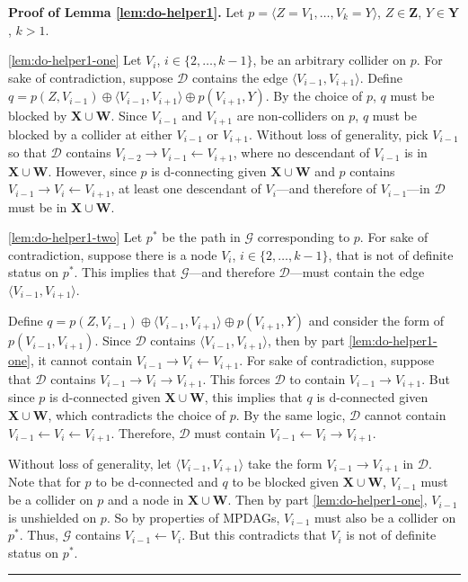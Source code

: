 \documentclass[11pt]{article}
\newcommand{\BlackBox}{\rule{1.5ex}{1.5ex}}  %
\newcommand{\mb}[1]{\mathbf{#1}}
\newcommand{\g}[1][G]{\mathcal{#1}}
\newenvironment{proofof}[1][]{\noindent \textbf{Proof of #1.}}{\hfill\BlackBox}
\begin{document}
\begin{proofof}[Lemma \ref{lem:do-helper1}]
    Let $p = \langle Z=V_1, \dots, V_k=Y \rangle$, $Z \in \mb{Z}$, $Y \in \mb{Y}$, $k > 1$.
    
    \ref{lem:do-helper1-one}
    Let $V_i$, $i \in \{2, \dots, k-1\}$, be an arbitrary collider on $p$. For sake of contradiction, suppose $\g[D]$ contains the edge $\langle V_{i-1}, V_{i+1} \rangle$. Define $q = p(Z,V_{i-1}) \oplus \langle V_{i-1}, V_{i+1} \rangle \oplus p(V_{i+1}, Y)$. By the choice of $p$, $q$ must be blocked by $\mb{X} \cup \mb{W}$. Since $V_{i-1}$ and $V_{i+1}$ are non-colliders on $p$, $q$ must be blocked by a collider at either $V_{i-1}$ or $V_{i+1}$. Without loss of generality, pick $V_{i-1}$ so that $\g[D]$ contains $V_{i-2} \to V_{i-1} \gets V_{i+1}$, where no descendant of $V_{i-1}$ is in $\mb{X} \cup \mb{W}$. However, since $p$ is d-connecting given $\mb{X} \cup \mb{W}$ and $p$ contains $V_{i-1} \to V_i \gets V_{i+1}$, at least one descendant of $V_i$---and therefore of $V_{i-1}$---in $\g[D]$ must be in $\mb{X} \cup \mb{W}$.

    \ref{lem:do-helper1-two}    
    Let $p^*$ be the path in $\g$ corresponding to $p$. For sake of contradiction, suppose there is a node $V_i$, $i \in \{2, \dots, k-1\}$, that is not of definite status on $p^*$. This implies that $\g$---and therefore $\g[D]$---must contain the edge $\langle V_{i-1}, V_{i+1} \rangle$. 

    Define $q = p(Z,V_{i-1}) \oplus \langle V_{i-1}, V_{i+1} \rangle \oplus p(V_{i+1}, Y)$ and consider the form of $p(V_{i-1},V_{i+1})$. Since $\g[D]$ contains $\langle V_{i-1}, V_{i+1} \rangle$, then by part \ref{lem:do-helper1-one}, it cannot contain $V_{i-1} \to V_i \gets V_{i+1}$. For sake of contradiction, suppose that $\g[D]$ contains $V_{i-1} \to V_i \to V_{i+1}$. This forces $\g[D]$ to contain $V_{i-1} \to V_{i+1}$. But since $p$ is d-connected given $\mb{X} \cup \mb{W}$, this implies that $q$ is d-connected given $\mb{X} \cup \mb{W}$, which contradicts the choice of $p$. By the same logic, $\g[D]$ cannot contain $V_{i-1} \gets V_i \gets V_{i+1}$. Therefore, $\g[D]$ must contain $V_{i-1} \gets V_i \to V_{i+1}$. 

    Without loss of generality, let $\langle V_{i-1}, V_{i+1} \rangle$ take the form $V_{i-1} \to V_{i+1}$ in $\g[D]$. Note that for $p$ to be d-connected and $q$ to be blocked given $\mb{X} \cup \mb{W}$, $V_{i-1}$ must be a collider on $p$ and a node in $\mb{X} \cup \mb{W}$. Then by part \ref{lem:do-helper1-one}, $V_{i-1}$ is unshielded on $p$. So by properties of MPDAGs, $V_{i-1}$ must also be a collider on $p^*$. Thus, $\g$ contains $V_{i-1} \gets V_i$. But this contradicts that $V_i$ is not of definite status on $p^*$.
\end{proofof}
\end{document}
